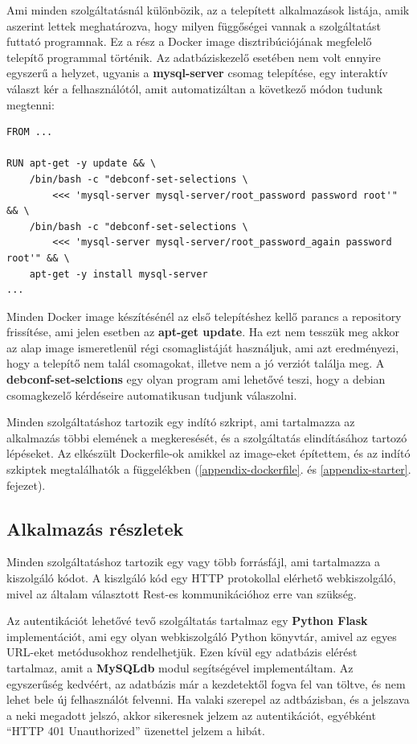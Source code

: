 \documentclass[11pt,magyar,a4paper,twoside,]{report}
\begin{document}
Ami minden szolgáltatásnál különbözik, az a telepített alkalmazások
listája, amik aszerint lettek meghatározva, hogy milyen függőségei
vannak a szolgáltatást futtató programnak. Ez a rész a Docker image
disztribúciójának megfelelő telepítő programmal történik. Az
adatbáziskezelő esetében nem volt ennyire egyszerű a helyzet, ugyanis a
\textbf{mysql-server} csomag telepítése, egy interaktív választ kér a
felhasználótól, amit automatizáltan a következő módon tudunk megtenni:

\begin{verbatim}
FROM ...

RUN apt-get -y update && \
    /bin/bash -c "debconf-set-selections \
        <<< 'mysql-server mysql-server/root_password password root'" && \
    /bin/bash -c "debconf-set-selections \
        <<< 'mysql-server mysql-server/root_password_again password root'" && \
    apt-get -y install mysql-server
...
\end{verbatim}

Minden Docker image készítésénél az első telepítéshez kellő parancs a
repository frissítése, ami jelen esetben az \textbf{apt-get update}. Ha
ezt nem tesszük meg akkor az alap image ismeretlenül régi csomaglistáját
használjuk, ami azt eredményezi, hogy a telepítő nem talál csomagokat,
illetve nem a jó verziót találja meg. A \textbf{debconf-set-selctions}
egy olyan program ami lehetővé teszi, hogy a debian csomagkezelő
kérdéseire automatikusan tudjunk válaszolni.

Minden szolgáltatáshoz tartozik egy indító szkript, ami tartalmazza az
alkalmazás többi elemének a megkeresését, és a szolgáltatás
elindításához tartozó lépéseket. Az elkészült Dockerfile-ok amikkel az
image-eket építettem, és az indító szkiptek megtalálhatók a függelékben
(\ref{appendix-dockerfile}. és \ref{appendix-starter}. fejezet).

\subsection{Alkalmazás részletek}\label{alkalmazuxe1s-ruxe9szletek}

Minden szolgáltatáshoz tartozik egy vagy több forrásfájl, ami
tartalmazza a kiszolgáló kódot. A kiszlgáló kód egy HTTP protokollal
elérhető webkiszolgáló, mivel az általam választott Rest-es
kommunikációhoz erre van szükség.

Az autentikációt lehetővé tevő szolgáltatás tartalmaz egy \textbf{Python
Flask} implementációt, ami egy olyan webkiszolgáló Python könyvtár,
amivel az egyes URL-eket metódusokhoz rendelhetjük. Ezen kívül egy
adatbázis elérést tartalmaz, amit a \textbf{MySQLdb} modul segítségével
implementáltam. Az egyszerűség kedvéért, az adatbázis már a kezdetektől
fogva fel van töltve, és nem lehet bele új felhasználót felvenni. Ha
valaki szerepel az adtbázisban, és a jelszava a neki megadott jelszó,
akkor sikeresnek jelzem az autentikációt, egyébként ``HTTP 401
Unauthorized'' üzenettel jelzem a hibát.
\end{document}
